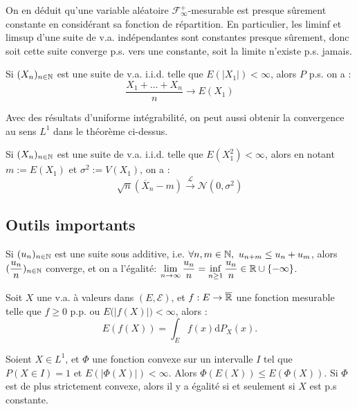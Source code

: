 \documentclass[11pt,a4paper]{article}
\begin{document}
\begin{rmq}
On en déduit qu'une variable aléatoire $ \mathcal{F}_\infty^+ $-mesurable est presque sûrement constante en considérant sa fonction de répartition. En particulier, les liminf et limsup d'une suite de v.a. indépendantes sont constantes presque sûrement, donc soit cette suite converge p.s. vers une constante, soit la limite n'existe p.s. jamais.
\end{rmq}

\begin{thmstar}
 Si $(X_n)_{n\in\mathbb N}$ est une suite de v.a. i.i.d. telle que $E(|X_1|)<\infty$, alors $P$ p.s. on a :
\[\frac{X_1 + \dots + X_n}{n} \to E(X_1) \]
\end{thmstar}

\begin{rmq}
Avec des résultats d'uniforme intégrabilité, on peut aussi obtenir la convergence au sens $L^1$ dans le théorème ci-dessus.
\end{rmq}

\begin{thmstar}
 Si $(X_n)_{n\in\mathbb N}$ est une suite de v.a. i.i.d. telle que $E(X_1^2)<\infty$, alors en notant $m := E(X_1)$ et $\sigma^2 := V(X_1)$, on a :
\[ \sqrt{n}(\overline{X}_n-m) \xrightarrow[]{\mathcal{L}} \mathcal{N}(0,\sigma^2) \]
\end{thmstar}

\subsection*{Outils importants}

\begin{lemmastar}
[Fekete] Si $(u_n)_{n\in\mathbb N}$ est une suite sous additive, i.e. $\forall n,m\in \N, \ u_{n+m} \leq u_n + u_m$, alors $\displaystyle (\frac{u_n}{n})_{n\in\mathbb N}$ converge, et on a l'égalité:  $\displaystyle \lim\limits_{n\to \infty} \frac{u_n}{n}=\inf_{n\geq 1} \frac{u_n}{n} \in \mathbb R \cup \{ -\infty\}$.
\end{lemmastar}

\begin{propstar}
 Soit $X$ une v.a. à valeurs dans $(E,\mathcal{E})$, et $f :E\to \overline{\mathbb R}$ une fonction mesurable telle que $f\geq0$ p.p. ou $E\big( \left|f(X)\right| \big) <\infty$, alors :
\[E(f(X))=\int_E f(x)\mathrm{d}P_X(x).\]
\end{propstar}

\begin{thmstar}
 Soient $X\in L^1$, et $\Phi$ une fonction convexe sur un intervalle $I$ tel que $P(X\in I)=1$ et $E(|\Phi(X)|)<\infty$. Alors $\Phi(E(X)) \leq E(\Phi(X))$. Si $\Phi$ est de plus strictement convexe, alors il y a égalité si et seulement si $X$ est p.s constante.
\end{thmstar}
\end{document}
